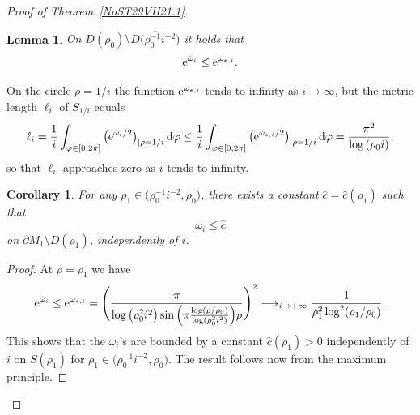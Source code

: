 \documentclass[pdftex]{sigma}
\numberwithin{equation}{section}
\newtheorem{Corollary}[Theorem]{Corollary}
\newtheorem{Lemma}[Theorem]{Lemma}
\newcommand{\hmv}{\red{\hat \omega}}
\newcommand{\rhozero}{\red{\rho_0}}
\newcommand{\red}[1]{{\color{red}#1}}
\newcommand{\mv}{\omega}%
\renewcommand{\red}[1]{#1}
\begin{document}
\begin{proof}[Proof of Theorem~\ref{NoST29VII21.1}]
\begin{Lemma}\label{NoSL23X21.1m}
On $D(\rhozero ) \setminus \overline{D\big(\rhozero^{-1} i^{-2}\big)}$ it holds that
\begin{equation} \label{NoS9XI21.2}
{\rm e}^{\hmv_i}\leq {\rm e}^{\mv_{*,i}}.
\end{equation}
\end{Lemma}

\begin{Remark} \label{NoSR22V22.1}
On the circle $\rho=1/i$ the function
${\rm e}^{\mv_{*,i}} $ tends to infinity as $i\to \infty$, but the metric length $\ell_i$ of $S_{1/i}$ equals
\[
\ell_i=\frac1i\int_{\varphi\in[0,2\pi]}\big({\rm e}^{\hmv_{i}/2}\big)_{|\rho=1/i}\, {\rm d} \varphi\leq\frac1i\int_{\varphi\in[0,2\pi]}\big({\rm e}^{\mv_{*,i}/2}\big)_{|\rho=1/i}\,{\rm d}\varphi=\frac{\pi^2}{\log{(\rho_0i)}},
\]
so that $\ell_i$ approaches zero as $i$ tends to infinity.
\end{Remark}

\begin{Corollary} \label{NoSC21XI21} For any $\rho_1\in\big(\rhozero^{-1} i^{-2},\rhozero \big)$,
 there exists a constant $\hat c =\hat c(\rho_1)$ such that
 \[
 \mv_i \le \hat c
 \]
 on $\partial M_1 \setminus D(\rho_1)$, independently of $i$.
\end{Corollary}

\begin{proof}
At $\rho=\rho_1$ we have
\begin{equation*}
{\rm e}^{\hmv_i}\leq {\rm e}^{\mv_{*,i}}=
\Bigg(
 \frac{\pi }{
 \log \big(\rho_0^2i^2\big) \sin\Big( \pi \frac{\log (\rho/\rho_0) }{\log (\rho_0^2i^2)} \Big) \rho
}
 \Bigg)^2
 \longrightarrow_{i\rightarrow +\infty}\frac{1}{\rho_1^2\log^2(\rho_1/\rhozero)}.
\end{equation*}
%
This shows that
the $\mv_i$'s are bounded by a constant $\hat c(\rho_1 ) >0 $ independently of $i$ on $S(\rho_1)$ for $\rho_1\in\big(\rhozero^{-1} i^{-2},\rhozero \big)$.
The result follows now from the maximum principle.
\end{proof}


\end{proof}
\end{document}
